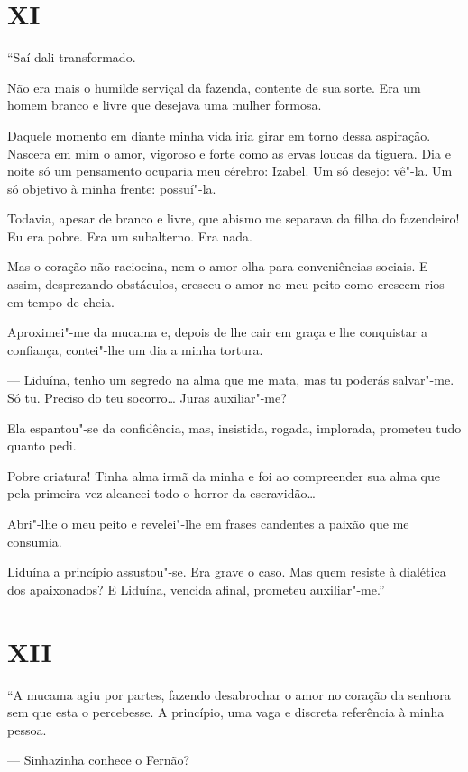 \section*{XI}

``Saí dali transformado.

Não era mais o humilde serviçal da fazenda, contente de sua sorte. Era
um homem branco e livre que desejava uma mulher formosa.

Daquele momento em diante minha vida iria girar em torno dessa
aspiração. Nascera em mim o amor, vigoroso e forte como as ervas loucas
da tiguera. Dia e noite só um pensamento ocuparia meu cérebro: Izabel.
Um só desejo: vê"-la. Um só objetivo à minha frente: possuí"-la.

Todavia, apesar de branco e livre, que abismo me separava da filha do
fazendeiro! Eu era pobre. Era um subalterno. Era nada.

Mas o coração não raciocina, nem o amor olha para conveniências sociais.
E assim, desprezando obstáculos, cresceu o amor no meu peito como
crescem rios em tempo de cheia.

Aproximei"-me da mucama e, depois de lhe cair em graça e lhe conquistar a
confiança, contei"-lhe um dia a minha tortura.

--- Liduína, tenho um segredo na alma que me mata, mas tu poderás
salvar"-me. Só tu. Preciso do teu socorro\ldots{} Juras auxiliar"-me?

Ela espantou"-se da confidência, mas, insistida, rogada, implorada,
prometeu tudo quanto pedi.

Pobre criatura! Tinha alma irmã da minha e foi ao compreender sua alma
que pela primeira vez alcancei todo o horror da escravidão\ldots{}

Abri"-lhe o meu peito e revelei"-lhe em frases candentes a paixão que me
consumia.

Liduína a princípio assustou"-se. Era grave o caso. Mas quem resiste à
dialética dos apaixonados? E Liduína, vencida afinal, prometeu
auxiliar"-me.''

\section*{XII}

``A mucama agiu por partes, fazendo desabrochar o amor no coração da
senhora sem que esta o percebesse. A princípio, uma vaga e discreta
referência à minha pessoa.

--- Sinhazinha conhece o Fernão?

